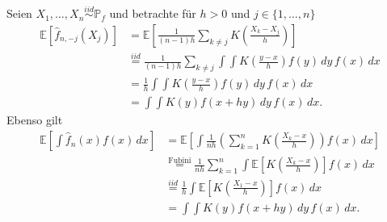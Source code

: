 \documentclass[10pt,]{article}
\begin{document}
Seien \(X_1, \ldots, X_n \overset{iid}{\sim} \mathbb{P}_f\) und
betrachte für \(h>0\) und \(j \in \{1, \ldots,n\}\) \[
\begin{aligned}
\mathbb{E}\left[ \hat{f}_{n,-j}(X_j) \right] &= \mathbb{E}\left[ \frac{1}{(n-1)h} \sum_{k\not=j} K\left( \frac{X_k-X_j}{h} \right) \right] \\
&\overset{iid}{=} \frac{1}{(n-1)h} \sum_{k\not=j} \int \int K\left( \frac{y-x}{h} \right) f(y) \, dy \, f(x) \, dx \\
&= \frac{1}{h} \int \int K\left( \frac{y-x}{h} \right) f(y) \, dy \, f(x) \, dx \\
&= \int \int K(y) f(x+hy) \, dy \, f(x) \, dx.
\end{aligned}
\] Ebenso gilt \[
\begin{aligned}
\mathbb{E} \left[ \int \hat{f}_n(x) f(x) \, dx \right] &= \mathbb{E} \left[ \int \frac{1}{nh} \left( \sum_{k=1}^n K\left( \frac{X_k-x}{h} \right) \right) f(x) \, dx \right] \\
&\overset{\text{Fubini}}{=} \frac{1}{nh} \sum_{k=1}^n \int \mathbb{E} \left[ K\left( \frac{X_k-x}{h} \right) \right] f(x) \, dx \\
&\overset{iid}{=} \frac{1}{h} \int \mathbb{E} \left[ K\left( \frac{X_1-x}{h} \right) \right] f(x) \, dx \\
&= \int \int K(y) f(x+hy) \, dy \, f(x) \, dx.
\end{aligned}
\]
\end{document}
